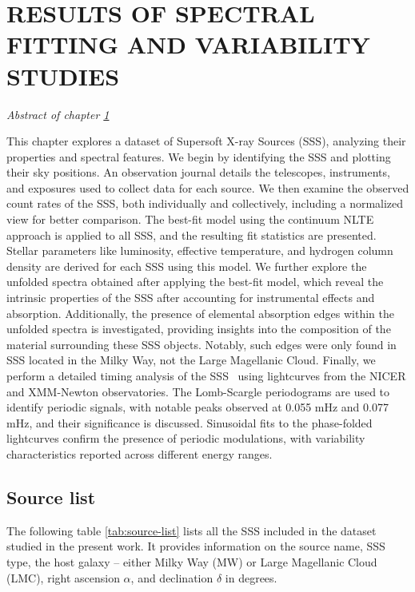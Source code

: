 \def\baselinestretch{1}
\chapter{RESULTS OF SPECTRAL FITTING AND VARIABILITY STUDIES} \label{chap:results}
    \minitoc
    \begin{center}
    	\emph{Abstract of chapter \ref{chap:results}}
    \end{center}
    This chapter explores a dataset of Supersoft X-ray Sources (SSS), analyzing their properties and spectral features. We begin by identifying the SSS and plotting their sky positions. An observation journal details the telescopes, instruments, and exposures used to collect data for each source. We then examine the observed count rates of the SSS, both individually and collectively, including a normalized view for better comparison. The best-fit model using the continuum NLTE approach is applied to all SSS, and the resulting fit statistics are presented. Stellar parameters like luminosity, effective temperature, and hydrogen column density are derived for each SSS using this model. We further explore the unfolded spectra obtained after applying the best-fit model, which reveal the intrinsic properties of the SSS after accounting for instrumental effects and absorption. Additionally, the presence of elemental absorption edges within the unfolded spectra is investigated, providing insights into the composition of the material surrounding these SSS objects. Notably, such edges were only found in SSS located in the Milky Way, not the Large Magellanic Cloud. Finally, we perform a detailed timing analysis of the SSS \source\ using lightcurves from the NICER and XMM-Newton observatories. The Lomb-Scargle periodograms are used to identify periodic signals, with notable peaks observed at 0.055 mHz and 0.077 mHz, and their significance is discussed. Sinusoidal fits to the phase-folded lightcurves confirm the presence of periodic modulations, with variability characteristics reported across different energy ranges.
    
    \section{Source list} \label{results:source-list}
    	The following table \ref{tab:source-list} lists all the SSS included in the dataset studied in the present work. It provides information on the source name, SSS type, the host galaxy -- either Milky Way (MW) or Large Magellanic Cloud (LMC), right ascension $\alpha$, and declination $\delta$ in degrees.
    	
